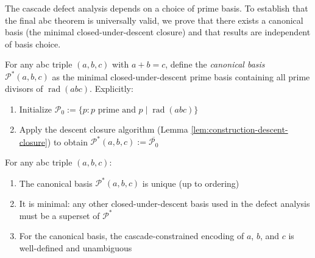 The cascade defect analysis depends on a choice of prime basis. To establish that the final abc theorem is universally valid, we prove that there exists a canonical basis (the minimal closed-under-descent closure) and that results are independent of basis choice.

\begin{definition}
\label{def:canonical-basis}

For any abc triple $(a,b,c)$ with $a+b=c$, define the \emph{canonical basis} $\mathcal{P}^*(a,b,c)$ as the minimal closed-under-descent prime basis containing all prime divisors of $\operatorname{rad}(abc)$. Explicitly:

\begin{enumerate}
\item Initialize $\mathcal{P}_0 := \{p : p \text{ prime and } p \mid \operatorname{rad}(abc)\}$
\item Apply the descent closure algorithm (Lemma \ref{lem:construction-descent-closure}) to obtain $\mathcal{P}^*(a,b,c) := \overline{\mathcal{P}_0}$
\end{enumerate}

\end{definition}

\begin{theorem}
\label{thm:canonical-basis-uniqueness}

For any abc triple $(a,b,c)$:

\begin{enumerate}
\item The canonical basis $\mathcal{P}^*(a,b,c)$ is unique (up to ordering)
\item It is minimal: any other closed-under-descent basis used in the defect analysis must be a superset of $\mathcal{P}^*$
\item For the canonical basis, the cascade-constrained encoding of $a$, $b$, and $c$ is well-defined and unambiguous
\end{enumerate}

\end{theorem}


